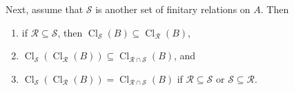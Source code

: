 \documentclass[12pt]{article}
\begin{document}
Next, assume that $\mathcal{S}$ is another set of finitary relations on $A$.  Then
\begin{enumerate}
\item if $\mathcal{R}\subseteq \mathcal{S}$, then $\operatorname{Cl}_{\mathcal{S}}(B) \subseteq \operatorname{Cl}_{\mathcal{R}}(B)$,
\item $\operatorname{Cl}_{\mathcal{S}}(\operatorname{Cl}_{\mathcal{R}}(B)) \subseteq  \operatorname{Cl}_{\mathcal{R}\cap\mathcal{S}}(B)$, and 
\item $\operatorname{Cl}_{\mathcal{S}}(\operatorname{Cl}_{\mathcal{R}}(B))= \operatorname{Cl}_{\mathcal{R}\cap\mathcal{S}}(B)$ if $\mathcal{R}\subseteq \mathcal{S}$ or $\mathcal{S}\subseteq \mathcal{R}$.
\end{enumerate}
\end{document}
